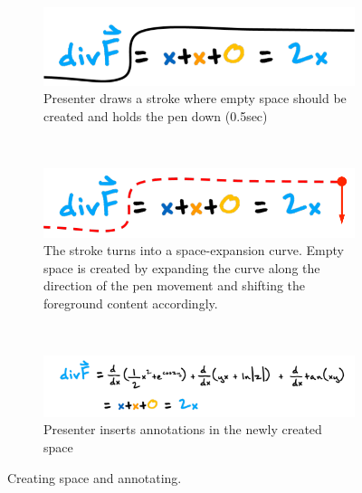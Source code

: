\begin{figure}[h!]
    \centering
    \begin{subfigure}[t]{0.48\columnwidth}
        \centering
        \includegraphics[width=1\columnwidth]{figures/create_space1}
        \caption{Presenter draws a stroke where empty space should be created and holds the pen down (0.5sec)}
    \end{subfigure}%
    ~ 
    \begin{subfigure}[t]{0.48\columnwidth}
        \centering
        \includegraphics[width=1\columnwidth]{figures/create_space2}
        \caption{The stroke turns into a space-expansion curve. Empty space is created by expanding the curve along the direction of the pen movement and shifting the foreground content accordingly.}
    \end{subfigure}
    ~
        \begin{subfigure}[t]{1\columnwidth}
        \centering
        \includegraphics[width=1\columnwidth]{figures/create_space3}
        \caption{Presenter inserts annotations in the newly created space }
    \end{subfigure}  
    \caption{Creating space and annotating.}
    \label{fig:space}
\end{figure}

